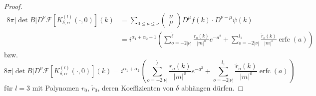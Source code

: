 \documentclass[12pt,a4paper]{scrartcl}
\numberwithin{equation}{section}
\newcommand{\F}{\mathcal{F}} %
\newcommand{\erfc}{\operatorname{erfc}}
\begin{document}
\begin{proof}
\begin{align*}
8 \pi |\det B| D^\nu \F[ K_{\delta,\alpha}^{(l)}(\cdot,0)](k)
&= \sum_{0 \leq \mu \leq \nu} \begin{pmatrix}
\nu \\ \mu
\end{pmatrix} D^\mu f(k) \cdot D^{\nu-\mu}\psi(k) \\
&= i^{\alpha_1+\alpha_2+1}\left(\sum_{o=-2|\nu|}^{\tilde \ell} \frac{r_o(k)}{|m|^o}e^{-a^2} + \sum_{o=-2|\nu|}^{l_1} \frac{\tilde r_o(k)}{|m|^o}\erfc(a) \right)
\end{align*}
bzw. 
\[
8 \pi |\det B| D^\nu \F[ K_{\delta,\alpha}^{(l)}(\cdot,0)](k) = i^{\alpha_1+\alpha_2}\left(\sum_{o=-2|\nu|}^{\tilde \ell} \frac{r_o(k)}{|m|^o}e^{-a^2} + \sum_{o=-2|\nu|}^{l_1} \frac{\tilde r_o(k)}{|m|^o}\erfc(a) \right)
\]
für $l=3$ mit Polynomen $r_0$, $\tilde r_0$, deren Koeffizienten von $\delta$ abhängen dürfen.


\end{proof}
\end{document}

